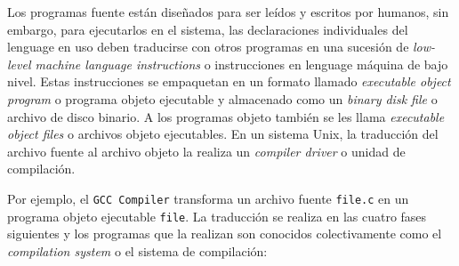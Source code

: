 Los programas fuente están diseñados para ser leídos y escritos por humanos, sin embargo, para ejecutarlos en el sistema, las declaraciones individuales del lenguage en uso deben traducirse con otros programas en una sucesión de \textit{low-level machine language instructions} o instrucciones en lenguage máquina de bajo nivel. Estas instrucciones se empaquetan en un formato llamado \textit{executable object program} o programa objeto ejecutable y almacenado como un \textit{binary disk file} o archivo de disco binario. A los programas objeto también se les llama \textit{executable object files} o archivos objeto ejecutables. En un sistema Unix, la traducción del archivo fuente al archivo objeto la realiza un \textit{compiler driver} o unidad de compilación. 
\bigskip

Por ejemplo, el \texttt{GCC Compiler} transforma un archivo fuente \texttt{file.c} en un programa objeto ejecutable \texttt{file}. La traducción se realiza en las cuatro fases siguientes y los programas que la realizan son conocidos colectivamente como el \textit{compilation system} o el sistema de compilación:


